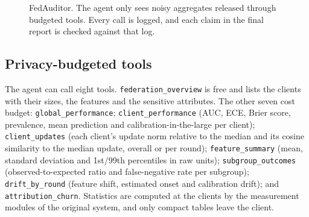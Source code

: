 \documentclass[conference]{IEEEtran}
\begin{document}
\begin{figure}[t]
\centering
{}
\caption{FedAuditor. The agent only sees noisy aggregates released through budgeted tools. Every
call is logged, and each claim in the final report is checked against that log.}
\label{fig:arch}
\end{figure}

\subsection{Privacy-budgeted tools}

The agent can call eight tools. \texttt{federation\_overview} is free and lists the clients with their
sizes, the features and the sensitive attributes. The other seven cost budget:
\texttt{global\_performance}; \texttt{client\_performance} (AUC, ECE, Brier score, prevalence, mean
prediction and calibration-in-the-large per client); \texttt{client\_updates} (each client's update
norm relative to the median and its cosine similarity to the median update, overall or per round);
\texttt{feature\_summary} (mean, standard deviation and 1st/99th percentiles in raw units);
\texttt{subgroup\_outcomes} (observed-to-expected ratio and false-negative rate per subgroup);
\texttt{drift\_by\_round} (feature shift, estimated onset and calibration drift); and
\texttt{attribution\_churn}. Statistics are computed at the clients by the measurement modules of
the original system, and only compact tables leave the client.
\end{document}
